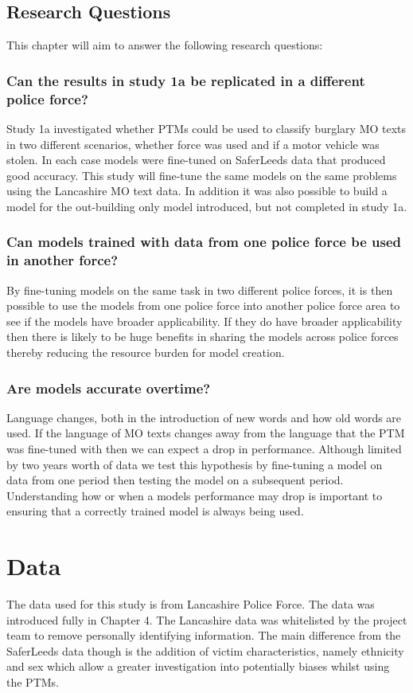 \subsection{Research Questions} This chapter will aim to answer the following research questions:


\subsubsection{Can the results in study 1a be replicated in a different police force?} Study 1a investigated whether PTMs could be used to classify burglary MO texts in two different scenarios, whether force was used and if a motor vehicle was stolen. In each case models were fine-tuned on SaferLeeds data that produced good accuracy. This study will fine-tune the same models on the same problems using the Lancashire MO text data.  In addition it was also possible to build a model for the out-building only model introduced, but not completed in study 1a.

\subsubsection{Can models trained with data from one police force be used in another force?} By fine-tuning models on the same task in two different police forces, it is then possible to use the models from one police force into another police force area to see if the models have broader applicability. If they do have broader applicability then there is likely to be huge benefits in sharing the models across police forces thereby reducing the resource burden for model creation.

\subsubsection{Are models accurate overtime?} Language changes, both in the introduction of new words and how old words are used. If the language of MO texts changes away from the language that the PTM was fine-tuned with then we can expect a drop in performance. Although limited by two years worth of data we test this hypothesis by fine-tuning a model on data from one period then testing the model on a subsequent period. Understanding how or when a models performance may drop is important to ensuring that a correctly trained model is always being used.

\section{Data} The data used for this study is from Lancashire Police Force. The data was introduced fully in Chapter 4. The Lancashire data was whitelisted by the project team to remove personally identifying information. The main difference from the SaferLeeds data though is the addition of victim characteristics, namely ethnicity and sex which allow a greater investigation into potentially biases whilst using the PTMs. 

